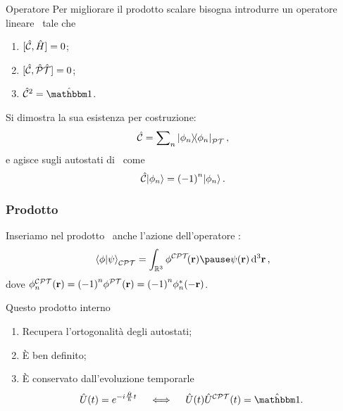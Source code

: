 \begin{frame}{Operatore \hC}
    Per migliorare il prodotto scalare bisogna introdurre un operatore lineare \hC\ tale che
    \begin{enumerate}[label=\mybullet]
        \pause
        \item $\comm*{\hC}{\hH}\! = 0$;
        \pause
        \item $\comm*{\hC}{\hPT}\! = 0$;
        \pause
        \item $\hC^2 = \hidM$.
    \end{enumerate}
    \pause
    Si dimostra la sua esistenza per costruzione:
    \begin{equation*}
        \hC = \sum\nolimits_n\dyad{\phi_n}{\phi_n}_{\PT}
        \mycomma
    \end{equation*}
    \pause
    e agisce sugli autostati di \hH\ come
    \begin{equation*}
        \hC\!\ket{\phi_n} = \pqty{-1}^n\!\ket{\phi_n}
        \myperiod
    \end{equation*}
\end{frame}

\begin{frame}
    \frametitle{Prodotto \CPT}
    Inseriamo nel prodotto \PT\ anche l'azione dell'operatore \hC :
    \begin{equation*}
        \braket{\phi}{\psi}_{\CPT} = \int\nolimits_{\bbR^3} \phi^{\CPT}\!\pqty{\vb{r}}\pause\psi\pqty{\vb{r}} \dd[3]{\vb{r}}
        \mycomma
    \end{equation*}
    dove $\phi^{\CPT}_n\pqty{\vb{r}} = \pqty{-1}^n\phi^{\PT}\pqty{\vb{r}} = \pqty{-1}^n\phi^*_n\pqty{-\vb{r}}$.

    \pause
    Questo prodotto interno
    \begin{enumerate}[label=\mybullet]
        \pause
        \item Recupera l'ortogonalità degli autostati;
        \pause
        \item È ben definito;
        \pause
        \item È conservato dall'evoluzione temporarle
            \begin{equation*}
                \hU\pqty{t} = \myexp{-i\frac{\hH}{\hbar}t}
                \quad\iff\quad
                \hU\pqty{t}\hU^{\CPT}\pqty{t} = \hidM 
                \myperiod
            \end{equation*}
    \end{enumerate}
\end{frame}


